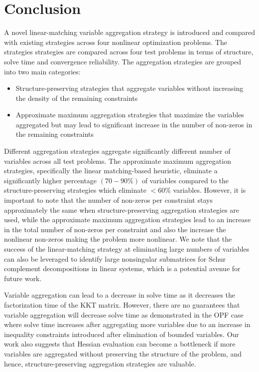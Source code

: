 \documentclass[smallextended]{svjour3}
\newcommand{\rev}[1]{{#1}}
\begin{document}
\section{Conclusion}
\rev{A novel linear-matching variable aggregation strategy is introduced
  and compared with existing strategies across four
nonlinear optimization problems.}
The strategies strategies are compared across four test problems
in terms of structure, solve time and convergence reliability. The
aggregation strategies are grouped into two main categories:
\begin{itemize}
    \item Structure-preserving strategies that aggregate variables without increasing the density of the remaining constraints
    \item Approximate maximum aggregation strategies that maximize the variables aggregated but may lead to significant increase in the number of non-zeros in the remaining constraints
\end{itemize}
Different aggregation strategies aggregate significantly different number of
variables across all test problems. The approximate maximum aggregation
strategies, specifically the linear matching-based heuristic, eliminate a
significantly higher percentage $(70-90\%)$ of variables compared to the
structure-preserving strategies which eliminate $<60\%$ variables.
However, it
is important to note that the number of non-zeros per constraint stays
approximately the same when structure-preserving aggregation strategies are
used, while the approximate maximum aggregation strategies lead to an increase
in the total number of non-zeros per constraint and also the increase the
nonlinear non-zeros making the problem more nonlinear. 
\rev{We note that the success of the linear-matching strategy at eliminating
  large numbers of variables can also be leveraged to identify large nonsingular
  submatrices for Schur complement decompositions in linear systems,
  which is a potential avenue for future work.}

Variable aggregation can lead to a decrease in solve time as it decreases the factorization time of the KKT matrix. However, there are no guarantees that variable aggregation will decrease solve time as demonstrated in the OPF case where solve time increases after aggregating more variables due to an increase in inequality constraints introduced after elimination of bounded variables. Our work also suggests that Hessian evaluation can become a bottleneck if more variables are aggregated without preserving the structure of the problem, and hence, structure-preserving aggregation strategies are valuable.  
\end{document}
